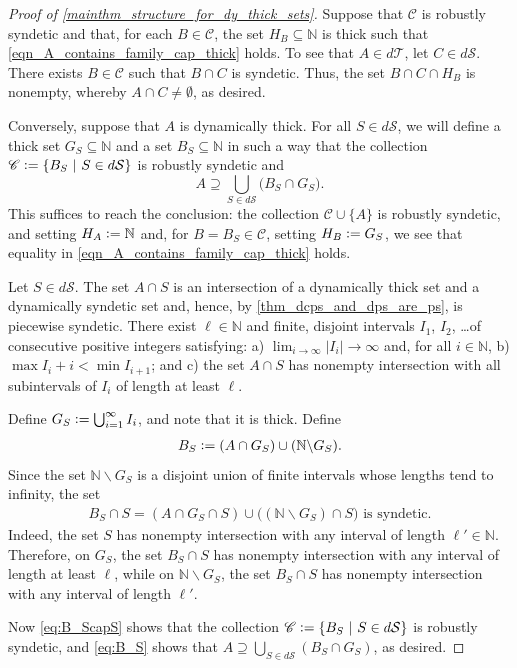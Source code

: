 \documentclass[letter,11pt]{article}
\theoremstyle{plain}
\theoremstyle{definition}
\theoremstyle{plain}
\theoremstyle{plain}
\numberwithin{equation}{section}
\newcommand{\N}{\mathbb{N}}
\newcommand{\defeq}{\vcentcolon=}
\renewcommand{\setminus}{\backslash}
\newcommand{\dsyndetic}{d\mathcal{S}}
\newcommand{\dthick}{d\mathcal{T}}
\newcommand{\collection}{\mathscr{C}}
\begin{document}
\begin{proof}[Proof of \cref{mainthm_structure_for_dy_thick_sets}]
    Suppose that $\collection$ is robustly syndetic and that, for each $B \in \collection$, the set $H_B \subseteq \N$ is thick such that \eqref{eqn_A_contains_family_cap_thick} holds. To see that $A \in \dthick$, let $C \in \dsyndetic$.  There exists $B \in \collection$ such that $B \cap C$ is syndetic. Thus, the set $B \cap C \cap H_B$ is nonempty, whereby $A \cap C \neq \emptyset$, as desired.

    Conversely, suppose that $A$ is dynamically thick.  For all $S \in \dsyndetic$, we will define a thick set $G_S \subseteq \N$ and a set $B_S \subseteq \N$ in such a way that the collection $\collection \defeq \{ B_S \ | \ S \in \dsyndetic\}$ is robustly syndetic and
    \[A \supseteq \bigcup_{S \in \dsyndetic} \big( B_S \cap G_S \big).\]
    This suffices to reach the conclusion: the collection $\collection \cup \{A\}$ is robustly syndetic, and setting $H_A \defeq \N$ and, for $B = B_S \in \collection$, setting $H_B \defeq G_{S}$, we see that equality in \eqref{eqn_A_contains_family_cap_thick} holds.

    Let $S \in \dsyndetic$. The set $A \cap S$ is an intersection of a dynamically thick set and a dynamically syndetic set and, hence, by \cref{thm_dcps_and_dps_are_ps}, is piecewise syndetic.  There exist $\ell \in \N$ and finite, disjoint intervals $I_1$, $I_2$, \dots of consecutive positive integers satisfying: a) $\lim_{i \to \infty} |I_i| \to \infty$ and, for all $i \in \N$, b) $\max I_i  + i< \min I_{i+1}$; and c) the set $A \cap S$ has nonempty intersection with all subintervals of $I_i$ of length at least $\ell$.  
    
    Define $G_S \defeq \bigcup_{i=1}^\infty I_i$, and note that it is thick.  Define
    \begin{align}
    \label{eq:B_S}
        B_S \defeq (A \cap G_S) \cup (\N \setminus G_S).
    \end{align}
    Since the set $\N \setminus G_S$ is a disjoint union of finite intervals whose lengths tend to infinity, the set
    \begin{align}
    \label{eq:B_ScapS}
        B_S \cap S = (A \cap G_S \cap S) \cup \big((\N \setminus G_S) \cap S \big) \text{ is syndetic.}
    \end{align}
    Indeed, the set $S$ has nonempty intersection with any interval of length $\ell' \in \N$.  Therefore, on $G_S$, the set $B_S \cap S$ has nonempty intersection with any interval of length at least $\ell$, while on $\N \setminus G_S$, the set $B_S \cap S$ has nonempty intersection with any interval of length $\ell'$.
    
    Now \eqref{eq:B_ScapS} shows that the collection $\collection \defeq \{B_S \ | \ S \in \dsyndetic\}$ is robustly syndetic, and \eqref{eq:B_S} shows that $A \supseteq \bigcup_{S \in \dsyndetic} (B_S \cap G_S)$, as desired.
\end{proof}
\end{document}
